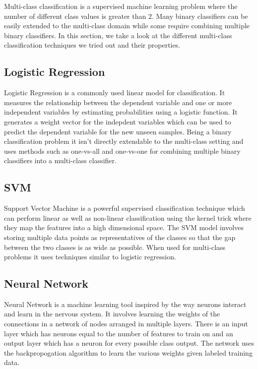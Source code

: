 \documentclass[]{sig-alternate}
\begin{document}
Multi-class classification is a supervised machine learning problem where the number of different class values is greater than 2. Many binary classifiers can be easily extended to the multi-class domain while some require combining multiple binary classifiers. In this section, we take a look at the different multi-class classification techniques we tried out and their properties. 

\subsection{Logistic Regression}
\label{subsec:LogisticRegression}

Logistic Regression is a commonly used linear model for classification. It measures the relationship between the dependent variable and one or more independent variables by estimating probabilities using a logistic function. It generates a weight vector for the indepdent variables which can be used to predict the dependent variable for the new unseen samples. Being a binary classification problem it isn't directly extendable to the multi-class setting and uses methods such as one-vs-all and one-vs-one for combining multiple binary classifiers into a multi-class classifier. 

\subsection{SVM}
\label{subsec:SVM}

Support Vector Machine is a powerful supervised classification technique which can perform linear as well as non-linear classification using the kernel trick where they map the features into a high dimensional space. The SVM model involves storing multiple data points as representatives of the classes so that the gap between the two classes is as wide as possible. When used for multi-class problems it uses techniques similar to logistic regression. 

\subsection{Neural Network}
\label{subsec:NeuralNetwork}

Neural Network is a machine learning tool inspired by the way neurons interact and learn in the nervous system. It involves learning the weights of the connections in a network of nodes arranged in multiple layers. There is an input layer which has neurons equal to the number of features to train on and an output layer which has a neuron for every possible class output. The network uses the backpropogation algorithm to learn the various weights given labeled training data. 
\end{document}
